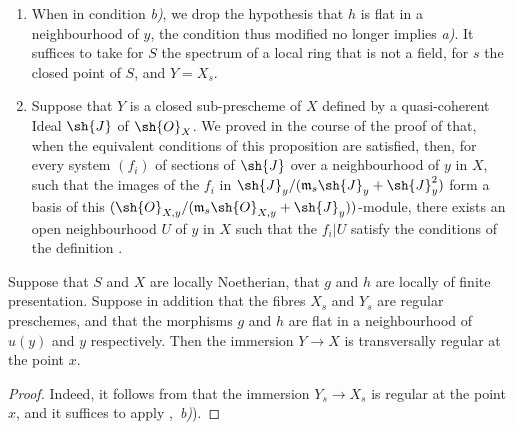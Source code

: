 \begin{remarks}[19.2.5]
\label{IV.19.2.5}
\medskip\noindent
\begin{enumerate}[label=(\roman*)]
  \item When in condition \emph{b)}, we drop the hypothesis that $h$ is flat in a neighbourhood of $y$, the condition thus modified no longer implies \emph{a)}.
It suffices to take for $S$ the spectrum of a local ring that is not a field, for $s$ the closed point of $S$, and $Y=X_s$.
  \item Suppose that $Y$ is a closed sub-prescheme of $X$ defined by a quasi-coherent Ideal $\sh{J}$ of $\sh{O}_X$.
We proved in the course of the proof of  that, when the equivalent conditions of this proposition are satisfied, then, for every system $(f_i)$ of sections of $\sh{J}$ over a neighbourhood of $y$ in $X$, such that the images of the $f_i$ in $\sh{J}_y/(\mathfrak{m}_s\sh{J}_y+\sh{J}_y^2)$ form a basis of this $(\sh{O}_{X,y}/(\mathfrak{m}_s\sh{O}_{X,y}+\sh{J}_y))$-module, there exists an open neighbourhood $U$ of $y$ in $X$ such that the $f_i|U$ satisfy the conditions of the definition .
\end{enumerate}
\end{remarks}

\begin{corollary}[19.2.6]
\label{IV.19.2.6}
Suppose that $S$ and $X$ are locally Noetherian, that $g$ and $h$ are locally of finite presentation.
Suppose in addition that the fibres $X_s$ and $Y_s$ are regular preschemes, and that the morphisms $g$ and $h$ are flat in a neighbourhood of $u(y)$ and $y$ respectively.
Then the immersion $Y\to X$ is transversally regular at the point $x$.
\end{corollary}

\begin{proof}
Indeed, it follows from  that the immersion $Y_s\to X_s$ is regular at the point $x$, and it suffices to apply ,~\emph{b)}).
\end{proof}

